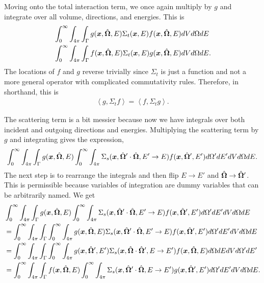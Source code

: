 Moving onto the total interaction term, we once again multiply by $g$ and integrate over all volume, directions, and energies. This is
\begin{align}
  &\int_0^\infty \int_{4\pi} \int_\Gamma g(\bm{x},\hat{\mathbf{\Omega}},E) \Sigma_t(\bm{x},E) f(\bm{x},\hat{\mathbf{\Omega}},E) dV d\Omega dE \nonumber \\
  &\int_0^\infty \int_{4\pi} \int_\Gamma f(\bm{x},\hat{\mathbf{\Omega}},E) \Sigma_t(\bm{x},E) g(\bm{x},\hat{\mathbf{\Omega}},E) dV d\Omega dE .
\end{align}
The locations of $f$ and $g$ reverse trivially since $\Sigma_t$ is just a function and not a more general operator with complicated commutativity rules. Therefore, in shorthand, this is
\begin{align}
  \left< g, \Sigma_t f \right> = \left< f, \Sigma_t g \right> .
\end{align}

The scattering term is a bit messier because now we have integrals over both incident and outgoing directions and energies. Multiplying the scattering term by $g$ and integrating gives the expression,
\begin{align}
  \int_0^\infty \int_{4\pi} \int_\Gamma g(\bm{x},\hat{\mathbf{\Omega}},E) \int_0^\infty \int_{4\pi} \Sigma_s(\bm{x}, \hat{\mathbf{\Omega}}' \cdot \hat{\mathbf{\Omega}} , E' \rightarrow E ) f(\bm{x},\hat{\mathbf{\Omega}}',E') d\Omega' dE' dV d\Omega dE . \nonumber
\end{align}
The next step is to rearrange the integrals and then flip $E \rightarrow E'$ and $\hat{\mathbf{\Omega}} \rightarrow \hat{\mathbf{\Omega}}'$. This is permissible because variables of integration are dummy variables that can be arbitrarily named. We get
\begin{align}
  &\int_0^\infty \int_{4\pi} \int_\Gamma g(\bm{x},\hat{\mathbf{\Omega}},E) \int_0^\infty \int_{4\pi} \Sigma_s(\bm{x}, \hat{\mathbf{\Omega}}' \cdot \hat{\mathbf{\Omega}} , E' \rightarrow E ) f(\bm{x},\hat{\mathbf{\Omega}}',E') d\Omega' dE' dV d\Omega dE  \nonumber \\
  &= \int_0^\infty \int_{4\pi} \int_\Gamma \int_0^\infty \int_{4\pi} g(\bm{x},\hat{\mathbf{\Omega}},E) \Sigma_s(\bm{x}, \hat{\mathbf{\Omega}}' \cdot \hat{\mathbf{\Omega}} , E' \rightarrow E ) f(\bm{x},\hat{\mathbf{\Omega}}',E') d\Omega' dE' dV d\Omega dE \nonumber \\
  &= \int_0^\infty \int_{4\pi} \int_\Gamma \int_0^\infty \int_{4\pi} g(\bm{x},\hat{\mathbf{\Omega}}',E') \Sigma_s(\bm{x}, \hat{\mathbf{\Omega}} \cdot \hat{\mathbf{\Omega}}' , E \rightarrow E' ) f(\bm{x},\hat{\mathbf{\Omega}},E) d\Omega dE dV d\Omega' dE' \nonumber \\
  &= \int_0^\infty \int_{4\pi} \int_\Gamma f(\bm{x},\hat{\mathbf{\Omega}},E) \int_0^\infty \int_{4\pi}  \Sigma_s(\bm{x}, \hat{\mathbf{\Omega}}' \cdot \hat{\mathbf{\Omega}} , E \rightarrow E' ) g(\bm{x},\hat{\mathbf{\Omega}}',E') d\Omega' dE' dV d\Omega dE .
\end{align}

